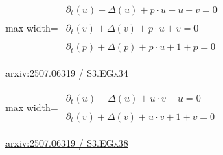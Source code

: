 \documentclass[10pt,a4paper]{article}
\begin{document}
\begin{minipage}{\linewidth}
\begin{center}\begin{adjustbox}{max width=\linewidth}$\displaystyle\begin{gathered}\begin{gathered}\partial_{t}(u)+\Delta(u)+p\cdot u+u+v=0\end{gathered}\\[5pt]\begin{gathered}\partial_{t}(v)+\Delta(v)+p\cdot u+v=0\end{gathered}\\[5pt]\begin{gathered}\partial_{t}(p)+\Delta(p)+p\cdot u+1+p=0\end{gathered}\end{gathered}$\end{adjustbox}\end{center}
{\small \href{https://arxiv.org/html/2507.06319#S3.EGx34}{arxiv:2507.06319 / S3.EGx34}}\par
\end{minipage}\par\vspace{7mm}

\begin{minipage}{\linewidth}
\begin{center}\begin{adjustbox}{max width=\linewidth}$\displaystyle\begin{gathered}\begin{gathered}\partial_{t}(u)+\Delta(u)+u\cdot v+u=0\end{gathered}\\[5pt]\begin{gathered}\partial_{t}(v)+\Delta(v)+u\cdot v+1+v=0\end{gathered}\end{gathered}$\end{adjustbox}\end{center}
{\small \href{https://arxiv.org/html/2507.06319#S3.EGx38}{arxiv:2507.06319 / S3.EGx38}}\par
\end{minipage}\par\vspace{7mm}
\end{document}
